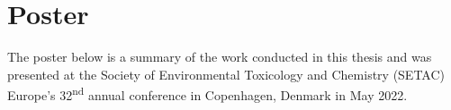 \chapter{Poster}\label{appSec:poster}
The poster below is a summary of the work conducted in this thesis and was presented at the Society of Environmental Toxicology and Chemistry (SETAC) Europe's 32\textsuperscript{nd} annual conference in Copenhagen, Denmark in May 2022.



